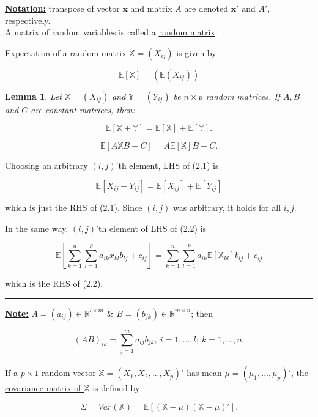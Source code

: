 \documentclass[twoside]{article}
\newtheorem{lemma}[theorem]{Lemma}
\newenvironment{proof}{{\bf Proof:}}{\hfill\rule{2mm}{2mm}}
\begin{document}
\underline{\textbf{Notation:}} transpose of vector $\mathbf{x}$ and matrix $A$ are denoted $\mathbf{x}'$ and $A'$, respectively.\\

A matrix of random variables is called a \underline{random matrix}.

Expectation of a random matrix $\mathbb{X}=(X_{ij})$ is given by

$$\mathbb{E[X]}=(\mathbb{E}(X_{ij}))$$

\begin{lemma}
	Let $\mathbb{X}=(X_{ij})$ and $\mathbb{Y}=(Y_{ij})$ be $n\times p$ random matrices. If $A,B$ and $C$ are constant matrices, then:
	
	

\begin{equation} \label{eq1}
\mathbb{E[X+Y]=E[X]+E[Y]}.
\end{equation}

\begin{equation} \label{eq2}
\mathbb{E}[A\mathbb{X}B+C]=A\mathbb{E[X]}B+C.
\end{equation}
\end{lemma}

\begin{proof}
Choosing an arbitrary $(i,j)$'th element, LHS of (2.1) is 

$$\mathbb{E}[X_{ij}+Y_{ij}]=\mathbb{E}[X_{ij}]+\mathbb{E}[Y_{ij}]$$

which is just the RHS of (2.1). Since $(i,j)$ was arbitrary, it holds for all $i,j$.

In the same way, $(i,j)$'th	element of LHS of (2.2) is 

$$\mathbb{E}\left[\sum^n_{k=1}\sum^p_{l=1}a_{ik}x_{kl}b_{lj}+c_{ij}\right]=\sum^n_{k=1}\sum^p_{l=1}a_{ik}\mathbb{E}[\mathbb{X}_{kl}]b_{lj}+c_{ij}$$

which is the RHS of (2.2).
\end{proof}

\underline{\textbf{Note:}} $A=(a_{ij})\in \mathbb{R}^{l\times m}$ \& $B=(b_{jk})\in\mathbb{R}^{m\times n}$; then

$$(AB)_{ik}=\sum^m_{j=1}a_{ij}b_{jk},\ i=1,\dots,l;\ k=1,\dots,n.$$\\

If a $p\times 1$ random vector $\mathbb{X}=(X_1,X_2,\dots, X_p)'$ has mean $\mu=(\mu_1,\dots, \mu_p)'$, the \underline{covariance matrix of $\mathbb{X}$} is defined by

$$\Sigma=Var(\mathbb{X})=\mathbb{E}\left[(\mathbb{X}-\mu)(\mathbb{X}-\mu)'\right].$$
\end{document}
